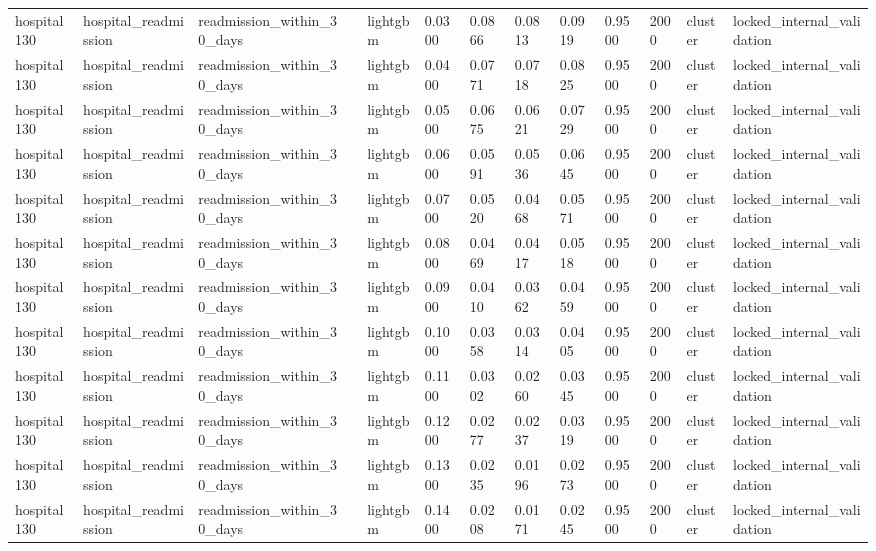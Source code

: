 \begin{tabular}{lllllllllllll}
hospital130 & hospital\_readmission & readmission\_within\_30\_days &  & lightgbm & 0.0300 & 0.0866 & 0.0813 & 0.0919 & 0.9500 & 2000 & cluster & locked\_internal\_validation \\
hospital130 & hospital\_readmission & readmission\_within\_30\_days &  & lightgbm & 0.0400 & 0.0771 & 0.0718 & 0.0825 & 0.9500 & 2000 & cluster & locked\_internal\_validation \\
hospital130 & hospital\_readmission & readmission\_within\_30\_days &  & lightgbm & 0.0500 & 0.0675 & 0.0621 & 0.0729 & 0.9500 & 2000 & cluster & locked\_internal\_validation \\
hospital130 & hospital\_readmission & readmission\_within\_30\_days &  & lightgbm & 0.0600 & 0.0591 & 0.0536 & 0.0645 & 0.9500 & 2000 & cluster & locked\_internal\_validation \\
hospital130 & hospital\_readmission & readmission\_within\_30\_days &  & lightgbm & 0.0700 & 0.0520 & 0.0468 & 0.0571 & 0.9500 & 2000 & cluster & locked\_internal\_validation \\
hospital130 & hospital\_readmission & readmission\_within\_30\_days &  & lightgbm & 0.0800 & 0.0469 & 0.0417 & 0.0518 & 0.9500 & 2000 & cluster & locked\_internal\_validation \\
hospital130 & hospital\_readmission & readmission\_within\_30\_days &  & lightgbm & 0.0900 & 0.0410 & 0.0362 & 0.0459 & 0.9500 & 2000 & cluster & locked\_internal\_validation \\
hospital130 & hospital\_readmission & readmission\_within\_30\_days &  & lightgbm & 0.1000 & 0.0358 & 0.0314 & 0.0405 & 0.9500 & 2000 & cluster & locked\_internal\_validation \\
hospital130 & hospital\_readmission & readmission\_within\_30\_days &  & lightgbm & 0.1100 & 0.0302 & 0.0260 & 0.0345 & 0.9500 & 2000 & cluster & locked\_internal\_validation \\
hospital130 & hospital\_readmission & readmission\_within\_30\_days &  & lightgbm & 0.1200 & 0.0277 & 0.0237 & 0.0319 & 0.9500 & 2000 & cluster & locked\_internal\_validation \\
hospital130 & hospital\_readmission & readmission\_within\_30\_days &  & lightgbm & 0.1300 & 0.0235 & 0.0196 & 0.0273 & 0.9500 & 2000 & cluster & locked\_internal\_validation \\
hospital130 & hospital\_readmission & readmission\_within\_30\_days &  & lightgbm & 0.1400 & 0.0208 & 0.0171 & 0.0245 & 0.9500 & 2000 & cluster & locked\_internal\_validation \\

\end{tabular}
